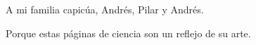 
\begin{dedication} 

A mi familia capicúa, Andrés, Pilar y Andrés.

\smallskip

Porque estas páginas de ciencia son un reflejo de su arte.

\end{dedication}

